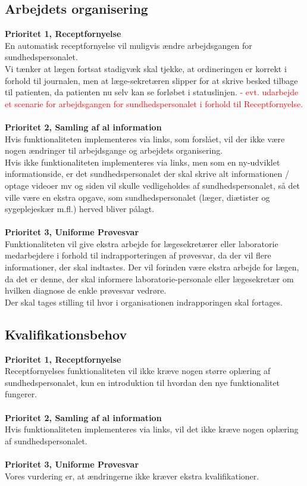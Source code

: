 \subsection{Arbejdets organisering}  
\textbf{Prioritet 1, Receptfornyelse} \\
En automatisk receptfornyelse vil muligvis ændre arbejdsgangen for sundhedspersonalet. \\ 
Vi tænker at lægen fortsat stadigvæk skal tjekke, at ordineringen er korrekt i forhold til journalen, men at læge-sekretæren slipper for at skrive besked tilbage til patienten, da patienten nu selv kan se forløbet i statuslinjen.
%
\textcolor{red}{ - evt. udarbejde et scenarie for arbejdsgangen for sundhedspersonalet i forhold til Receptfornyelse.}
\\\\
\textbf{Prioritet 2, Samling af al information} \\
Hvis funktionaliteten implementeres via links, som forslået, vil der ikke være nogen ændringer til arbejdsgange og arbejdets organisering. \\
Hvis ikke funktionaliteten implementeres via links, men som en ny-udviklet informationside, er det sundhedspersonalet der skal skrive alt informationen / optage videoer mv og siden vil skulle vedligeholdes af sundhedspersonalet, så det ville være en ekstra opgave, som sundhedspersonalet (læger, diætister og sygeplejeskær m.fl.) herved bliver pålagt.
\\\\
\textbf{Prioritet 3, Uniforme Prøvesvar} \\
Funktionaliteten vil give ekstra arbejde for lægesekretærer eller laboratorie medarbejdere i forhold til indrapporteringen af prøvesvar, da der vil flere informationer, der skal indtastes. Der vil forinden være ekstra arbejde for lægen, da det er denne, der skal informere laboratorie-personale eller lægesekretær om hvilken diagnose de enkle prøvesvar vedrøre.\\
Der skal tages stilling til hvor i organisationen indrapporingen skal fortages.
\subsection{Kvalifikationsbehov}
\textbf{Prioritet 1, Receptfornyelse} \\
Receptfornyelses funktionaliteten vil ikke kræve nogen større oplæring af sundhedspersonalet, kun en introduktion til hvordan den nye funktionalitet fungerer.
\\\\
\textbf{Prioritet 2, Samling af al information} \\
Hvis funktionaliteten implementeres via links, vil det ikke kræve nogen oplæring af sundhedspersonalet.
\\\\
\textbf{Prioritet 3, Uniforme Prøvesvar} \\
Vores vurdering er, at ændringerne ikke kræver ekstra kvalifikationer.